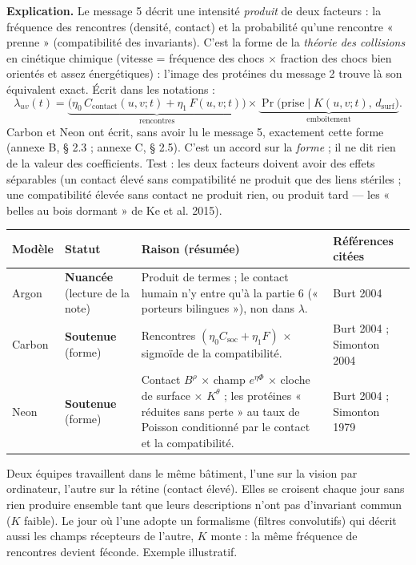 \documentclass[a4paper,11pt]{article}
\makeatletter
\newenvironment{avis}{\small\renewcommand{\arraystretch}{1.15}%
\begin{longtable}{@{}>{\raggedright\arraybackslash}p{1.35cm}>{\raggedright\arraybackslash}p{2.45cm}>{\raggedright\arraybackslash}p{7.15cm}>{\raggedright\arraybackslash}p{4.4cm}@{}}
\toprule \textbf{Modèle} & \textbf{Statut} & \textbf{Raison (résumée)} & \textbf{Références citées}\\ \midrule \endhead
\bottomrule \endfoot}{\end{longtable}}
\newcommand{\st}[1]{\textbf{#1}}
\makeatother
\begin{document}
\textbf{Explication.} Le message 5 décrit une intensité \emph{produit} de deux facteurs : la fréquence des rencontres (densité, contact) et la probabilité qu'une rencontre « prenne » (compatibilité des invariants). C'est la forme de la \emph{théorie des collisions} en cinétique chimique (vitesse = fréquence des chocs $\times$ fraction des chocs bien orientés et assez énergétiques) : l'image des protéines du message 2 trouve là son équivalent exact. Écrit dans les notations :
\[
\lambda_{uv}(t)=\underbrace{\big(\eta_0\,C_{\text{contact}}(u,v;t)+\eta_1\,F(u,v;t)\big)}_{\text{rencontres}}\times\underbrace{\Pr\big(\text{prise}\mid K(u,v;t),\,d_{\text{surf}}\big)}_{\text{emboîtement}}.
\]
Carbon et Neon ont écrit, sans avoir lu le message 5, exactement cette forme (annexe B, § 2.3 ; annexe C, § 2.5). C'est un accord sur la \emph{forme} ; il ne dit rien de la valeur des coefficients. Test : les deux facteurs doivent avoir des effets séparables (un contact élevé sans compatibilité ne produit que des liens stériles ; une compatibilité élevée sans contact ne produit rien, ou produit tard — les « belles au bois dormant » de Ke et al. 2015).

\begin{avis}
Argon & \st{Nuancée} (lecture de la note) & Produit de termes ; le contact humain n'y entre qu'à la partie 6 (« porteurs bilingues »), non dans $\lambda$. & Burt 2004\\ \midrule
Carbon & \st{Soutenue} (forme) & Rencontres $(\eta_0C_{\text{soc}}+\eta_1F)$ $\times$ sigmoïde de la compatibilité. & Burt 2004 ; Simonton 2004\\ \midrule
Neon & \st{Soutenue} (forme) & Contact $B^{\rho}$ $\times$ champ $e^{\eta\Phi}$ $\times$ cloche de surface $\times$ $K^{\theta}$ ; les protéines « réduites sans perte » au taux de Poisson conditionné par le contact et la compatibilité. & Burt 2004 ; Simonton 1979\\
\end{avis}

\begin{exemple}
Deux équipes travaillent dans le même bâtiment, l'une sur la vision par ordinateur, l'autre sur la rétine (contact élevé). Elles se croisent chaque jour sans rien produire ensemble tant que leurs descriptions n'ont pas d'invariant commun ($K$ faible). Le jour où l'une adopte un formalisme (filtres convolutifs) qui décrit aussi les champs récepteurs de l'autre, $K$ monte : la même fréquence de rencontres devient féconde. Exemple illustratif.
\end{exemple}
\end{document}
